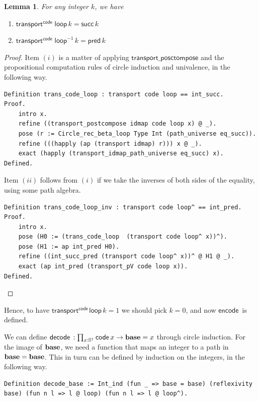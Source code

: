 \documentclass[12 pt]{amsart}
\newtheorem{lemma}[subsubsection]{Lemma}
\theoremstyle{definition}
\theoremstyle{remark}
\newcommand{\base}{\mathsf{\bf base}}
\newcommand{\C}{{\mathbb{S}^1}}
\newcommand{\lo}{\mathsf{ loop}}
\newcommand{\trans}{\mathsf{transport}}
\newcommand{\code}{{\mathsf{ code}\,}}
\newcommand{\encode}{{\mathsf{ encode}\,}}
\newcommand{\decode}{{\mathsf{ decode}\,}}
\newcommand{\suc}{\mathsf{succ}}
\newcommand{\pred}{\mathsf{pred}}
\newcommand{\transportpostcompose}{\mathsf{transport\_posctompose}}
\begin{document}
\begin{lemma} For any integer $k$, we have
\begin{enumerate}
    \item $\trans^{\code}\,\lo\, k = \suc\, k$
    \item $\trans^{\code}\,\lo^{-1}\, k = \pred\, k$
\end{enumerate}
\label{lemma:812}
\end{lemma}

\begin{proof}
Item $(i)$ is a matter of applying $\transportpostcompose$ and the propositional computation rules of circle induction and univalence, in the following way.

\begin{lstlisting}
Definition trans_code_loop : transport code loop == int_succ.
Proof.
    intro x.
    refine ((transport_postcompose idmap code loop x) @ _).
    pose (r := Circle_rec_beta_loop Type Int (path_universe eq_succ)).
    refine (((happly (ap (transport idmap) r))) x @ _).
    exact (happly (transport_idmap_path_universe eq_succ) x).
Defined.
\end{lstlisting}

Item $(ii)$ follows from $(i)$ if we take the inverses of both sides of the equality, using some path algebra.

\begin{lstlisting}
Definition trans_code_loop_inv : transport code loop^ == int_pred.
Proof.
    intro x.
    pose (H0 := (trans_code_loop  (transport code loop^ x))^).
    pose (H1 := ap int_pred H0).
    refine ((int_succ_pred (transport code loop^ x))^ @ H1 @ _).
    exact (ap int_pred (transport_pV code loop x)).
Defined.
\end{lstlisting}

\end{proof}

Hence, to have $\trans^{\code} \lo\,k = 1$ we should pick $k = 0$, and now $\encode$ is defined.

We can define $\decode : \prod_{x : \C} \code x \to \base = x$ through circle induction. For the image of $\base$, we need a function that maps an integer to a path in $\base = \base$. This in turn can be defined by induction on the integers, in the following way.

\begin{lstlisting}
Definition decode_base := Int_ind (fun _ => base = base) (reflexivity base) (fun n l => l @ loop) (fun n l => l @ loop^).   
\end{lstlisting}
\end{document}
